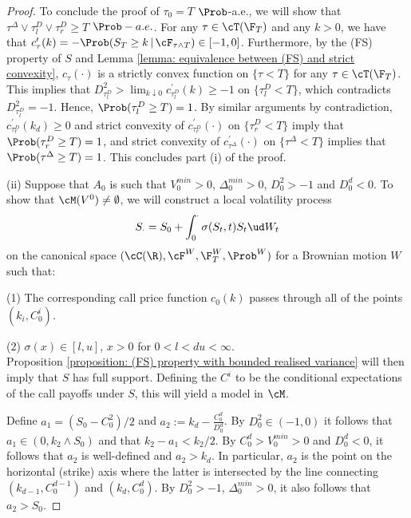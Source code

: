 \documentclass[11pt]{article}
\begin{document}
\begin{proof}
To conclude the proof of $\tau_0 = T$ $\Prob$-a.e., we will show that $\tau^\Delta \vee \tau^D_l \vee \tau^D_r \geq T$ $\Prob-a.e.$. For any $\tau \in \cT(\F_T)$ and any $k > 0$, we have that $c^\prime_\tau(k) = - \Prob( S_T \geq k \, | \, \cF_{\tau \wedge T}) \in [-1,0]$. Furthermore, by the (FS) property of $S$ and Lemma \ref{lemma: equivalence between (FS) and strict convexity}, $c_\tau(\cdot)$ is a strictly convex function on $\{ \tau < T \}$ for any $\tau \in \cT(\F_T)$. This implies that $D^2_{\tau^D_l} > \lim_{k \downarrow 0} c^\prime_{\tau^D_l}(k) \geq -1$ on $\{\tau^D_l < T\}$, which contradicts $D^2_{\tau^D_l} = -1$. Hence, $\Prob( \tau^D_l \geq T) = 1$. By similar arguments by contradiction, $c^\prime_{\tau^D_r}(k_d) \geq 0$ and strict convexity of $c^\prime_{\tau^D_r}(\cdot)$ on $\{ \tau^D_r < T \}$ imply that $\Prob( \tau^D_r \geq T ) = 1$, and strict convexity of $c^\prime_{\tau^\Delta}(\cdot)$ on $\{ \tau^\Delta < T \}$ implies that $\Prob( \tau^\Delta \geq T ) = 1$. This concludes part (i) of the proof. \\

\item (ii) Suppose that $A_0$ is such that $V^{min}_0 > 0$, $\Delta^{min}_0 > 0$, $D^2_0 > -1$ and $D^d_0 < 0$. To show that $\cM(V^0) \neq \emptyset$, we will construct a local volatility process 
$$
S_\cdot = S_0 + \int_0^\cdot \sigma(S_t, t) S_t \ud W_t
$$
on the canonical space $(\cC(\R), \cF^W, \F^W_T, \Prob^W)$ for a Brownian motion $W$ such that:
\item (1) The corresponding call price function $c_0(k)$ passes through all of the points $(k_i, C^i_0)$.
\item (2) $\sigma(x) \in [l,u]$, $x > 0$ for $0 < l < du< \infty$. \\
Proposition \ref{proposition: (FS) property with bounded realised variance} will then imply that $S$ has full support. Defining the $C^i$ to be the conditional expectations of the call payoffs under $S$, this will yield a model in $\cM$.

Define $a_1 = (S_0 - C^2_0)/2$ and $a_2 := k_d - \frac{C^d_0}{D^d_0}$. By $D^2_0 \in (-1, 0)$ it follows that $a_1 \in (0, k_2 \wedge S_0)$ and that $k_2 - a_1 < k_2/2$. By $C^d_0 > V^{min}_0 > 0$ and $D^d_0 < 0$, it follows that $a_2$ is well-defined and $a_2 > k_d$. In particular, $a_2$ is the point on the horizontal (strike) axis where the latter is intersected by the line connecting $(k_{d-1},C^{d-1}_0)$ and $(k_d,C^d_0)$. By $D^2_0 > -1$, $\Delta^{min}_0 > 0$, it also follows that $a_2 > S_0$.


\end{proof}
\end{document}
